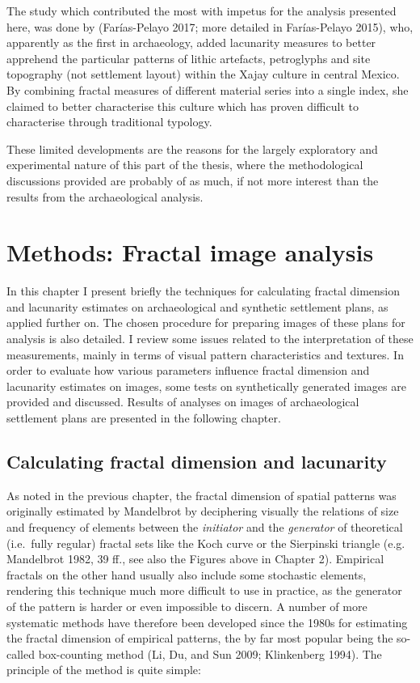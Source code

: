 \documentclass[
  12pt,
  a4paper, twoside]{book}
\begin{document}
The study which contributed the most with impetus for the analysis presented here, was done by (Farías-Pelayo 2017; more detailed in Farías-Pelayo 2015), who, apparently as the first in archaeology, added lacunarity measures to better apprehend the particular patterns of lithic artefacts, petroglyphs and site topography (not settlement layout) within the Xajay culture in central Mexico. By combining fractal measures of different material series into a single index, she claimed to better characterise this culture which has proven difficult to characterise through traditional typology.

These limited developments are the reasons for the largely exploratory and experimental nature of this part of the thesis, where the methodological discussions provided are probably of as much, if not more interest than the results from the archaeological analysis.

\hypertarget{images-methods}{%
\chapter{Methods: Fractal image analysis}\label{images-methods}}

In this chapter I present briefly the techniques for calculating fractal dimension and lacunarity estimates on archaeological and synthetic settlement plans, as applied further on. The chosen procedure for preparing images of these plans for analysis is also detailed. I review some issues related to the interpretation of these measurements, mainly in terms of visual pattern characteristics and textures. In order to evaluate how various parameters influence fractal dimension and lacunarity estimates on images, some tests on synthetically generated images are provided and discussed. Results of analyses on images of archaeological settlement plans are presented in the following chapter.

\hypertarget{images-procedure}{%
\section{Calculating fractal dimension and lacunarity}\label{images-procedure}}

As noted in the previous chapter, the fractal dimension of spatial patterns was originally estimated by Mandelbrot by deciphering visually the relations of size and frequency of elements between the \emph{initiator} and the \emph{generator} of theoretical (i.e.~fully regular) fractal sets like the Koch curve or the Sierpinski triangle (e.g. Mandelbrot 1982, 39 ff., see also the Figures above in Chapter 2). Empirical fractals on the other hand usually also include some stochastic elements, rendering this technique much more difficult to use in practice, as the generator of the pattern is harder or even impossible to discern. A number of more systematic methods have therefore been developed since the 1980s for estimating the fractal dimension of empirical patterns, the by far most popular being the so-called box-counting method (Li, Du, and Sun 2009; Klinkenberg 1994). The principle of the method is quite simple:
\end{document}
